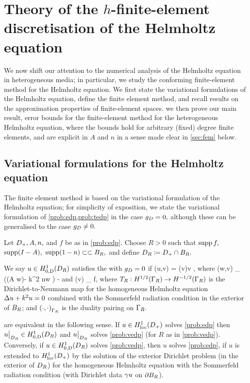 \section[FE Theory for the Helmholtz Equation]{Theory of the $h$-finite-element discretisation of the Helmholtz equation}\label{sec:helmfe}

We now shift our attention to the numerical analysis of the Helmholtz equation in heterogeneous media; in particular, we  study the conforming finite-element method for the Helmholtz equation. We first state the variational formulations of the Helmholtz equation, define the finite element method, and recall results on the approximation properties of finite-element spaces. we then prove our main result, error bounds for the finite-element method for the heterogeneous Helmholtz equation, where the bounds hold for arbitrary (fixed) degree finite elements, and are explicit in $A$ and $n$ in a sense made clear in \cref{sec:fem} below.

  \subsection{Variational formulations for the Helmholtz equation}\label{sec:varform}
  The finite element method is based on the variational formulation of the Helmholtz equation; for simplicity of exposition, we state the variational formulation of \cref{prob:edp,prob:tedp} in the case $g_{D} = 0,$ although these can be generalised to the case $g_{D} \neq 0.$
  
\bprob[Variational formulation of EDP when $\gD = 0$]\label{prob:vedp}
Let $D_{+}, A, n,$ and $f$ be as in \cref{prob:edp}. Choose $R>0$ such that $\operatorname{supp} f,$ $\operatorname{supp}(I-A),$ $\operatorname{supp}(1-n) \subset\subset B_{R},$ and define $D_{R} \coloneqq D_{+} \cap B_{R}.$

We say $u \in \HozDDR$ satisfies the  with $\gD = 0$ if
\beqs
\aE(u,v) = \FE(v)\quad \tfa v \in \HozDDR,
\eeqs
where
\beq\label{eq:aedp}
\aE(w,v) \de \int_{\DR} \mleft(\mleft(A \grad w\mright)\cdot\grad \vbar - k^2 n\minispace w \vbar\mright) - 
\eeq
and
\beq\label{eq:Ledp}
\FE(v) \de \int_{\DR} f\minispace\vbar,
\eeq
where $\DtN:\HhGR\rightarrow \HmhGR$ is the Dirichlet-to-Neumann map for the homogeneous Helmholtz equation $\Delta u + k^2 u = 0$ combined with the Sommerfeld radiation condition in the exterior of $B_{R}$; and $\DPGR{\cdot}{\cdot}$ is the duality pairing on $\Gamma_{R}.$
\eprob

\label{lem:edpform}
 are equivalent in the following sense. If $u \in \HolocDp$ solves \cref{prob:edp} then $u\restrict_{\DR} \in \HozDDR$ and $u\big|_{D_{R}}$ solves \cref{prob:vedp}  (for $R$ as in \cref{prob:vedp}). Conversely, if $u \in \HozDDR$ solves \cref{prob:vedp}, then $u$ solves \cref{prob:edp}, if $u$ is extended to $\HolocDp$ by the solution of the exterior Dirichlet problem (in the exterior of $D_{R}$) for the homogeneous Helmholtz equation with the Sommerfeld radiation condition (with Dirichlet data $\gamma u$ on $\partial B_{R}$).
\ele

